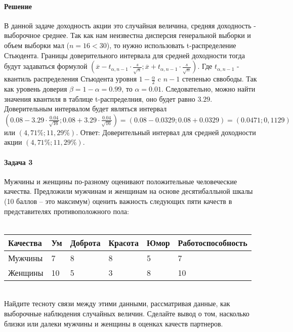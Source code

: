 \documentclass[a4paper, 12pt]{article}
\begin{document}
\paragraph{Решение}
В данной задаче доходность акции это случайная величина, средняя доходность - выборочное среднее. Так как нам неизвестна дисперсия генеральной выборки и объем выборки мал ($n = 16 < 30$), то нужно использовать t-распределение Стьюдента. Границы доверительного интервала для средней доходности тогда будут задаваться формулой
$(\overline{x} - t_{\alpha, n - 1}\cdot \frac{s}{\sqrt{n}}; \overline{x} + t_{\alpha, n-1}\cdot \frac{s}{\sqrt{n}})$. Где $t_{\alpha, n-1}$ - квантиль распределения Стьюдента уровня $1-\frac{\alpha}{2}$ c $n-1$ степенью сввободы. Так  как уровень доверия $\beta = 1 - \alpha = 0.99$, то $\alpha = 0.01$. Следовательно, можно найти значения квантиля в таблице t-распределния, оно будет равно $3.29$.
Доверительным интервалом будет являться интервал 
$(0.08 - 3.29 \cdot \frac{0.04}{\sqrt{16}}; 0.08 + 3.29\cdot \frac{0.04}{\sqrt{16}}) = (0.08 - 0.0329; 0.08 + 0.0329) = (0.0471; 0,1129)$ или $(4,71\%; 11,29\%)$.
Ответ: Доверительный интервал для средней доходности акции $(4,71\%; 11,29\%)$.






\paragraph{Задача 3}
Мужчины и женщины по-разному оценивают положительные человеческие качества. Предложили мужчинам и женщинам на основе десятибалльной шкалы (10 баллов – это максимум) оценить важность следующих пяти качеств в представителях противоположного пола:
\\
\\
\begin{minipage}{0.5\textwidth}
    \begin{center}
    \begin{tabular}{|l|l|l|l|l|l|}
    \hline
    Качества & Ум & Доброта  & Красота & Юмор & Работоспособность\\ \hline
    Мужчины & 7   & 8 & 8          & 5 & 7      \\ 
    \hline
    Женщины & 10   & 5  & 3          & 8 & 10      \\ 
    \hline
    \end{tabular}
    \label{table::no_lenses}
    \end{center}
\end{minipage}
\\
Найдите тесноту связи между этими данными, рассматривая данные, как выборочные наблюдения случайных величин. Сделайте вывод о том, насколько близки или далеки мужчины и женщины в оценках  качеств партнеров.
\end{document}
